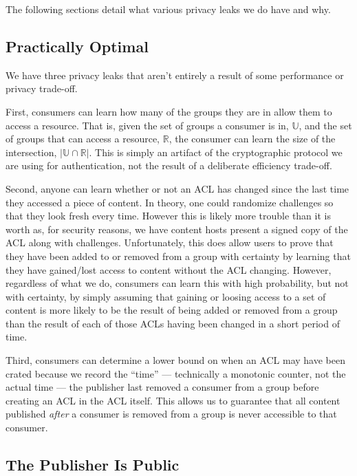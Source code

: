 \documentclass[pdftex,12pt,a4papaer]{report}
\begin{document}
The following sections detail what various privacy leaks we do have and why.

\subsection{Practically Optimal}
\label{sub:practically_optimal}

We have three privacy leaks that aren't entirely a result of some performance or
privacy trade-off.

First, consumers can learn how many of the groups they are in allow them to
access a resource. That is, given the set of groups a consumer is in,
$\mathbb{U}$, and the set of groups that can access a resource, $\mathbb{R}$,
the consumer can learn the size of the intersection, $|\mathbb{U} \cap
\mathbb{R}|$. This is simply an artifact of the cryptographic protocol we are
using for authentication, not the result of a deliberate efficiency trade-off.

Second, anyone can learn whether or not an ACL has changed since the last time
they accessed a piece of content. In theory, one could randomize challenges so
that they look fresh every time. However this is likely more trouble
than it is worth as, for security reasons, we have content hosts present a
signed copy of the ACL along with challenges. Unfortunately, this does allow
users to prove that they have been added to or removed from a group with
certainty by learning that they have gained/lost access to content without the
ACL changing. However, regardless of what we do, consumers can learn this with
high probability, but not with certainty, by simply assuming that gaining or
loosing access to a set of content is more likely to be the result of being
added or removed from a group than the result of each of those ACLs having been
changed in a short period of time.

Third, consumers can determine a lower bound on when an ACL may have been crated
because we record the ``time'' --- technically a monotonic counter, not the
actual time --- the publisher last removed a consumer from a group before creating
an ACL in the ACL itself. This allows us to guarantee that all content published
\emph{after} a consumer is removed from a group is never accessible to that
consumer.

\subsection{The Publisher Is Public}
\end{document}
